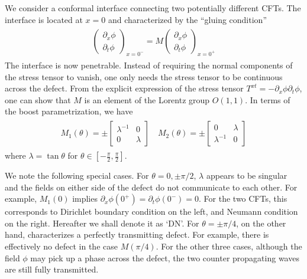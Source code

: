 We consider a conformal interface connecting two potentially different CFTs. The interface is located at $x=0$ and characterized by the ``gluing condition''
\begin{eqnarray}\begin{aligned}
\label{Def. of M}
\begin{pmatrix}
\partial_x\phi\\
\partial_t\phi
\end{pmatrix}_{x=0^-}
=M\begin{pmatrix}
\partial_x\phi\\
\partial_t\phi
\end{pmatrix}_{x=0^+}
\end{aligned}\end{eqnarray}
The interface is now penetrable. Instead of requiring the normal components of the stress tensor to vanish\cite{cardy_conformal_1984}, one only needs the stress tensor to be continuous across the defect. From the explicit expression of the stress tensor $T^{xt}=-\partial_x\phi\partial_t\phi$, one can show that\cite{bachas_permeable_2002} $M$ is an element of the Lorentz group $O(1,1)$. In terms of the boost parametrization, we have
\begin{eqnarray}\begin{aligned}
M_1(\theta)=\pm
\begin{bmatrix}
\lambda^{-1} & 0 \\
0 & \lambda
\end{bmatrix}\quad
M_2(\theta)=\pm
\begin{bmatrix}
0 & \lambda  \\
\lambda^{-1} & 0 
\end{bmatrix}
\end{aligned}\end{eqnarray}
where $\lambda=\tan\theta$ for $\theta\in\left[-\frac{\pi}{2},\frac{\pi}{2}\right]$. 

We note the following special cases. For $\theta=0,\pm\pi/2$, $\lambda$ appears to be singular and the fields on either side of the defect do not communicate to each other. For example, $M_1(0)$ implies $\partial_x\phi(0^+)=\partial_t\phi(0^-)=0$. For the two CFTs, this corresponds to Dirichlet boundary condition on the left, and Neumann condition on the right. Hereafter we shall denote it as `DN'. %
For $\theta=\pm\pi/4$, on the other hand, characterizes a perfectly transmitting defect. For example, there is effectively no defect in the case $M(\pi/4)$. For the other three cases, although the field $\phi$ may pick up a phase across the defect, the two counter propagating waves are still fully transmitted.

